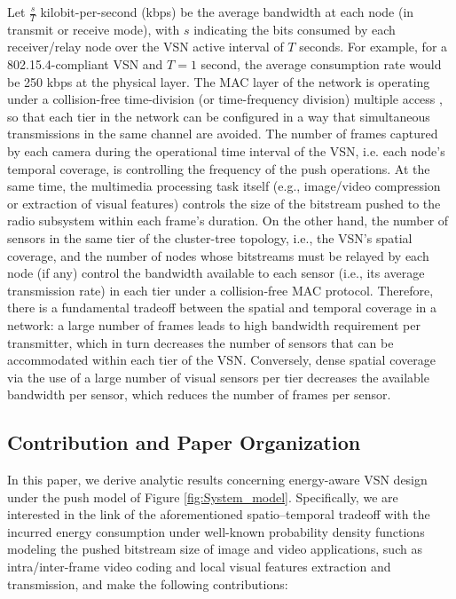 \documentclass[twocolumn,english]{IEEEtran}
\theoremstyle{plain}
\theoremstyle{definition}
\begin{document}
\noindent Let $\frac{s}{T}$ kilobit-per-second (kbps) be the average
bandwidth at each node (in transmit or receive mode), with $s$ indicating
the bits consumed by each receiver/relay node over the VSN active
interval of $T$ seconds. For example, for a 802.15.4-compliant VSN
and $T=1$ second, the average consumption rate would be 250 kbps
at the physical layer. The MAC layer of the network is operating under
a collision-free time-division (or time-frequency division) multiple
access \cite{ehsan2012survey,burana2012DTFDMA,LeungMACEssentials,tinka2010TSCH,degesys2007desync},
so that each tier in the network can be configured in a way that simultaneous
transmissions in the same channel are avoided. The number of frames
captured by each camera during the operational time interval of the
VSN, i.e. each node's temporal coverage, is controlling the frequency
of the push operations. At the same time, the multimedia processing
task itself (e.g., image/video compression or extraction of visual
features) controls the size of the bitstream pushed to the radio subsystem
within each frame's duration. On the other hand, the number of sensors
in the same tier of the cluster-tree topology, i.e., the VSN's spatial
coverage, and the number of nodes whose bitstreams must be relayed
by each node (if any) control the bandwidth available to each sensor
(i.e., its average transmission rate) in each tier under a collision-free
MAC protocol. Therefore, there is a fundamental tradeoff between the
spatial and temporal coverage in a network: a large number of frames
leads to high bandwidth requirement per transmitter, which in turn
decreases the number of sensors that can be accommodated within each
tier of the VSN. Conversely, dense spatial coverage via the use of
a large number of visual sensors per tier decreases the available
bandwidth per sensor, which reduces the number of frames per sensor.


\subsection{Contribution and Paper Organization}

In this paper, we derive analytic results concerning energy-aware
VSN design under the push model of Figure \ref{fig:System_model}.
Specifically, we are interested in the link of the aforementioned
spatio--temporal tradeoff with the incurred energy consumption under
well-known probability density functions modeling the pushed bitstream
size of image and video applications, such as intra/inter-frame video
coding and local visual features extraction and transmission, and
make the following contributions:
\end{document}
